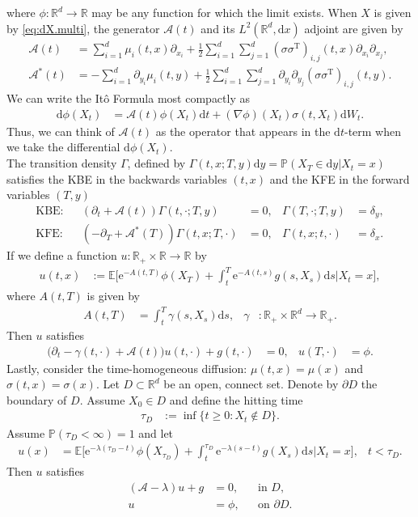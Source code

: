 \documentclass[12pt]{book}
\let\varphi\phi
\numberwithin{equation}{chapter}
\theoremstyle{plain}
\numberwithin{theorem}{section}
\theoremstyle{definition}
\numberwithin{exercise}{chapter}
\newcommand{\<}{\langle}
\renewcommand{\>}{\rangle}
\renewcommand{\(}{\left(}
\renewcommand{\)}{\right)}
\renewcommand{\[}{\left[}
\renewcommand{\]}{\right]}
\newcommand\Eb{\mathds{E}}
\newcommand\Pb{\mathds{P}}
\newcommand\Rb{\mathds{R}}
\newcommand\Ac{\mathscr{A}}
\newcommand\sig{\sigma}
\newcommand\gam{\gamma}
\newcommand\Gam{\Gamma}
\newcommand\lam{\lambda}
\newcommand\del{\delta}
\renewcommand\d{\partial}
\newcommand\dd{\mathrm{d}}
\newcommand\ee{\mathrm{e}}
\begin{document}
where $\varphi: \Rb^d \to \Rb$ may be any function for which the limit exists.
When $X$ is given by \eqref{eq:dX.multi}, the generator $\Ac(t)$ and its $L^2(\Rb^d,\dd x)$ adjoint are given by
\begin{align}
\Ac(t)
	&=	\sum_{i=1}^d \mu_i(t,x)\d_{x_i} + \tfrac{1}{2} \sum_{i=1}^d \sum_{j=1}^d (\sig \sig^\text{T})_{i,j}(t,x) \d_{x_i} \d_{x_j} , \\
\Ac^*(t)
	&=	- \sum_{i=1}^d \d_{y_i} \mu_i(t,y) + \tfrac{1}{2} \sum_{i=1}^d \sum_{j=1}^d \d_{y_i} \d_{y_j} (\sig \sig^\text{T})_{i,j}(t,y) . 
\end{align}
We can write the It\^o Formula most compactly as
\begin{align}
\dd \varphi(X_t)
	&=	\Ac(t) \varphi(X_t) \dd t + (\nabla \varphi)(X_t) \sig(t,X_t) \dd W_t .
\end{align}
Thus, we can think of $\Ac(t)$ as the operator that appears in the $\dd t$-term when we take the differential $\dd \varphi(X_t)$.
\\[0.5em]
The transition density $\Gam$, defined by $\Gam(t,x;T,y) \dd y = \Pb(X_T \in \dd y | X_t = x)$ satisfies the KBE in the backwards variables $(t,x)$ and the KFE in the forward variables $(T,y)$
\begin{align}
\text{KBE}:&&
\(\d_t + \Ac(t) \) \Gam(t,\cdot;T,y)
	&=	0 , &
\Gam(T,\cdot;T,y)
	&=	\del_y , \\
\text{KFE}:&&
\(-\d_T + \Ac^*(T) \) \Gam(t,x;T,\cdot)
	&=	0 , &
\Gam(t,x;t,\cdot)
	&=	\del_x .
\end{align}
If we define a function $u : \Rb_+ \times \Rb \to \Rb$ by
\begin{align}
u(t,x)
	&:=	\Eb \Big[ \ee^{-A(t,T)}\varphi(X_T) + \int_t^T \ee^{-A(t,s)}g(s,X_s) \dd s \Big| X_t = x \Big] , 
\end{align}
where $A(t,T)$ is given by
\begin{align}
A(t,T)
	&=	\int_t^T \gam(s,X_s) \dd s, &
\gam
	&:	\Rb_+ \times \Rb^d \to \Rb_+ .
\end{align}
Then $u$ satisfies
\begin{align}
\Big( \d_t - \gam(t,\cdot) + \Ac(t) \Big) u(t,\cdot) + g(t,\cdot)
	&=	0 , &
u(T,\cdot)
	&= \varphi .
\end{align}
Lastly, consider the time-homogeneous diffusion: $\mu(t,x) = \mu(x)$ and $\sig(t,x) = \sig(x)$.  Let $D \subset \Rb^d$ be an open, connect set.  Denote by $\d D$ the boundary of $D$.  Assume $X_0 \in D$ and define the hitting time
\begin{align}
\tau_D
	&:=	\inf \{ t \geq 0 : X_t \notin D \} .
\end{align}
Assume $\Pb( \tau_D < \infty ) = 1$ and let 
\begin{align}
u(x)
	&=	\Eb \Big[ \ee^{-\lam(\tau_D-t)}\varphi( X_{\tau_D} ) + \int_t^{\tau_D} \ee^{- \lam(s-t)} g(X_s) \dd s \Big| X_t = x \Big] , &
t
	< \tau_D .
\end{align}
Then $u$ satisfies
\begin{align}
(\Ac - \lam) u + g
	&= 0 , &
	&\text{in $D$} , \\
u
	&=	\varphi , &
	&\text{on $\d D$} .
\end{align}
\end{document}
